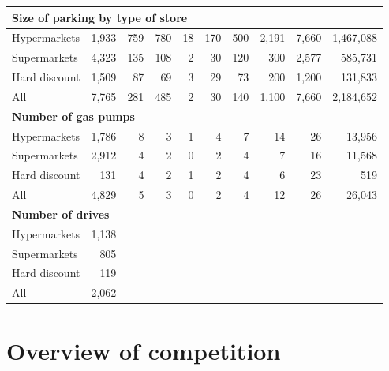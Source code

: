 \documentclass[11pt]{article}
\begin{document}
\begin{table}[H]
\begin{tabular}{lrrrrrrrrr}
\multicolumn{10}{l}{\textbf{Size of parking by type of store}} \\
\midrule
Hypermarkets  &      1,933 &        759 &        780 &         18 &        170 &        500 &      2,191 &      7,660 &  1,467,088 \\
Supermarkets  &      4,323 &        135 &        108 &          2 &         30 &        120 &        300 &      2,577 &    585,731 \\
Hard discount &      1,509 &         87 &         69 &          3 &         29 &         73 &        200 &      1,200 &    131,833 \\
\midrule
All           &      7,765 &        281 &        485 &          2 &         30 &        140 &      1,100 &      7,660 &  2,184,652 \\
\midrule

\multicolumn{10}{l}{\textbf{Number of gas pumps}} \\
\midrule
Hypermarkets  &      1,786 &          8 &          3 &          1 &          4 &          7 &         14 &         26 &     13,956 \\
Supermarkets  &      2,912 &          4 &          2 &          0 &          2 &          4 &          7 &         16 &     11,568 \\
Hard discount &        131 &          4 &          2 &          1 &          2 &          4 &          6 &         23 &        519 \\
\midrule
All           &      4,829 &          5 &          3 &          0 &          2 &          4 &         12 &         26 &     26,043 \\
\midrule

\multicolumn{10}{l}{\textbf{Number of drives}} \\
\midrule
Hypermarkets  &   1,138 & \multicolumn{8}{c}{} \\
Supermarkets  &   805 & \multicolumn{8}{c}{} \ \\
Hard discount  &   119 & \multicolumn{8}{c}{} \ \\
\midrule
All           &    2,062& \multicolumn{8}{c}{}  \\
\bottomrule

\end{tabular}

\end{table}


\section{Overview of competition}
\end{document}
